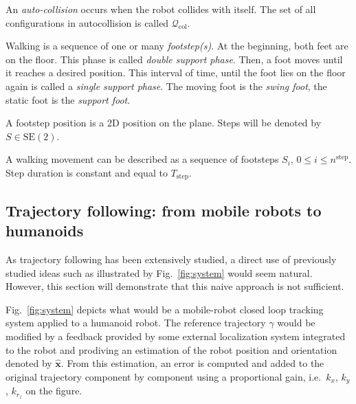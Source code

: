 An \emph{auto-collision} occurs when the robot collides with
itself. The set of all configurations in autocollision is called
\mbox{$\mathcal{Q}_{\text{col}}$}.

Walking is a sequence of one or many \emph{footstep(s)}. At the
beginning, both feet are on the floor. This phase is called
\emph{double support phase}. Then, a foot moves until it reaches a
desired position. This interval of time, until the foot lies on the
floor again is called a \emph{single support phase}. The moving foot
is the \emph{swing foot}, the static foot is the \emph{support foot}.

A footstep position is a 2D position on the plane. Steps will be
denoted by \mbox{$S \in \text{SE}(2)$}.

A walking movement can be described as a sequence of footsteps $S_i$,
\mbox{$0 \leq i \leq n^{\text{step}}$}. Step duration is constant and equal
to $T_{\text{step}}$.


\subsection{Trajectory following: from mobile robots to humanoids}


As trajectory following has been extensively studied, a direct use of
previously studied ideas such as illustrated by Fig.~\ref{fig:system}
would seem natural. However, this section will demonstrate that this
naive approach is not sufficient.


Fig.~\ref{fig:system} depicts what would be a mobile-robot closed loop
tracking system applied to a humanoid robot. The reference trajectory
$\gamma$ would be modified by a feedback provided by some external
localization system integrated to the robot and prodiving an
estimation of the robot position and orientation denoted by
$\hat{\mathbf{x}}$. From this estimation, an error is computed and
added to the original trajectory component by component using a
proportional gain, i.e.\ $k_x$, $k_y$, $k_{r_z}$ on the figure.


